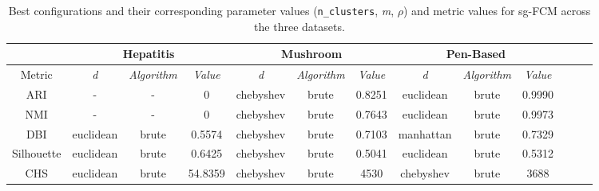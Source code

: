 \begin{table}[h!]
	\centering
	\begin{tabular}{|c|c|c|c|c|c|c|c|c|c|c|c|c|}
		\hline
		& \multicolumn{3}{c|}{Hepatitis} & \multicolumn{3}{c|}{Mushroom} & \multicolumn{3}{c|}{Pen-Based} \\ \hline
		Metric & \textit{d} & \textit{Algorithm} & \textit{Value} & \textit{d} & \textit{Algorithm} & \textit{Value} & \textit{d} & \textit{Algorithm} & \textit{Value} \\ \hline
		ARI            & -          & -         & 0  & chebyshev & brute & 0.8251         & euclidean & brute & 0.9990 \\ \hline
		NMI            & -          & -         & 0  & chebyshev & brute & 0.7643         & euclidean & brute & 0.9973 \\ \hline
		DBI            & euclidean  & brute     & 0.5574   & chebyshev & brute & 0.7103         & manhattan & brute & 0.7329 \\ \hline
		Silhouette     & euclidean  & brute     & 0.6425   & chebyshev & brute & 0.5041         & euclidean & brute & 0.5312 \\ \hline
		CHS            & euclidean  & brute     & 54.8359  & chebyshev & brute & 4530           & chebyshev & brute & 3688 \\ \hline
	\end{tabular}
	\caption{Best configurations and their corresponding parameter values (\texttt{n\_clusters}, \textit{m}, \(\rho\)) and metric values for sg-FCM across the three datasets.}
	\label{tab:optics_best_runs}
\end{table}



